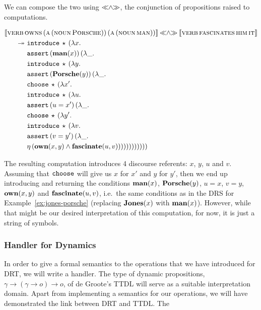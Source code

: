 We can compose the two using $\mathbin{\ll\!\!\land\!\!\gg}$, the conjunction of propositions
raised to computations.

\begin{align*}
  \llbracket \textsc{verb}\,&\textsc{owns}\,(\textsc{a}\,(\textsc{noun}\,\textsc{Porsche}))\,(\textsc{a}\,(\textsc{noun}\,\textsc{man})) \rrbracket \mathbin{\ll\!\!\land\!\!\gg} \llbracket \textsc{verb}\,\textsc{fascinates}\,\textsc{him}\,\textsc{it} \rrbracket \\
  \twoheadrightarrow &\ \mathtt{introduce}\,\star\,(\lambda x.\,  \\
       &\ \mathtt{assert}\,(\textbf{man}(x))\,(\lambda \_.\,  \\
       &\ \mathtt{introduce}\,\star\,(\lambda y.\,  \\
       &\ \mathtt{assert}\,(\textbf{Porsche}(y))\,(\lambda \_.\,  \\
       &\ \mathtt{choose}\,\star\,(\lambda x'.\,  \\
       &\ \mathtt{introduce}\,\star\,(\lambda u.\,  \\
       &\ \mathtt{assert}\,(u = x')\,(\lambda \_.\,  \\
       &\ \mathtt{choose}\,\star\,(\lambda y'.\,  \\
       &\ \mathtt{introduce}\,\star\,(\lambda v.\,  \\
       &\ \mathtt{assert}\,(v = y')\,(\lambda \_.\,  \\
       &\ \eta\,(\textbf{own}(x, y) \land \textbf{fascinate}(u, v))))))))))))
\end{align*}

The resulting computation introduces 4 discourse referents: $x$, $y$, $u$
and $v$. Assuming that $\mathtt{choose}$ will give us $x$ for $x'$ and $y$ for
$y'$, then we end up introducing and returning the conditions
$\textbf{man}(x)$, $\textbf{Porsche}(y)$, $u = x$, $v = y$, $\textbf{own}(x, y)$ and
$\textbf{fascinate}(u, v)$, i.e.\ the same conditions as in the DRS for
Example~\ref{ex:jones-porsche} (replacing $\textbf{Jones}(x)$ with
$\textbf{man}(x)$). However, while that might be our desired interpretation of
this computation, for now, it is just a string of symbols.


\subsubsection{Handler for Dynamics}

In order to give a formal semantics to the operations that we have
introduced for DRT, we will write a handler. The type of dynamic
propositions, $\gamma \to (\gamma \to o) \to o$, of de Groote's TTDL will
serve as a suitable interpretation domain. Apart from implementing a
semantics for our operations, we will have demonstrated the link between
DRT and TTDL. The

